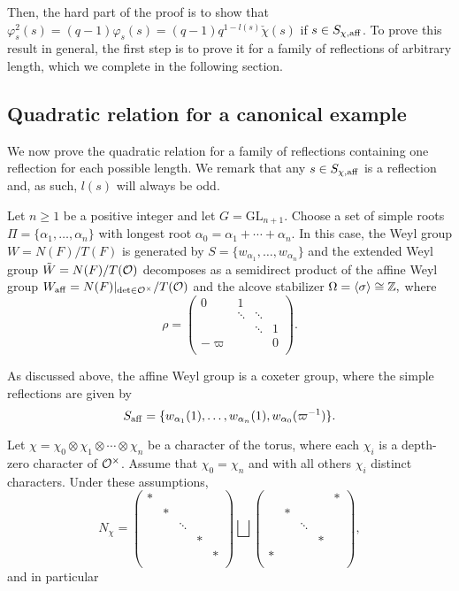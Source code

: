     Then, the hard part of the proof is to show that $\varphi_s^2(s)=(q-1)\varphi_s(s)=(q-1)q^{1-l(s)}\check{\chi}(s)$ if $s\in S_{\chi,\mathrm{aff}}$.
    To prove this result in general, the first step is to prove it for a family of reflections of arbitrary length, which we complete in the following section.

    \subsection{Quadratic relation for a canonical example}
    We now prove the quadratic relation for a family of reflections containing one reflection for each possible length. We remark that any $s\in S_{\chi,\mathrm{aff}}$ is a reflection and, as such, $l(s)$ will always be odd.

    Let $n\geq1$ be a positive integer and let $G=\mathrm{GL}_{n+1}$. Choose a set of simple roots $\Pi=\{\alpha_1,\ldots,\alpha_n\}$ with longest root $\alpha_0=\alpha_1+\cdots+\alpha_n$. In this case, the Weyl group $W=N(F)/T(F)$ is generated by $S=\{w_{\alpha_1},\ldots,w_{\alpha_n}\}$ and the extended Weyl group $\tilde{W}=N(F)/T(\mathcal{O})$ decomposes as a semidirect product of the affine Weyl group $W_{\mathrm{aff}}=N(F)|_{\det\in\mathcal{O}^\times}/T(\mathcal{O})$ and the alcove stabilizer $\Omega=\langle\sigma\rangle\cong\mathbb{Z},$ where
    $$\rho=\begin{pmatrix}
        0&1&&\\
        &\ddots&\ddots&\\
        &&\ddots&1\\
        -\varpi &&&0\\
    \end{pmatrix}.$$

    As discussed above, the affine Weyl group is a coxeter group, where the simple reflections are given by 
    $$S_{\mathrm{aff}}=\{w_{\alpha_1}(1),\ldots,w_{\alpha_n}(1),w_{\alpha_0}(\varpi^{-1})\}.$$

    Let $\chi=\chi_0\otimes\chi_1\otimes\cdots\otimes\chi_n$ be a character of the torus, where each $\chi_i$ is a depth-zero character of $\mathcal{O}^\times$. Assume that $\chi_0=\chi_n$ and with all others $\chi_i$ distinct characters. Under these assumptions, 
    $$N_\chi=\begin{pmatrix}
        *&&&&\\
        &*&&&\\
        &&\ddots&&\\
        &&&*&\\
        &&&&*\\
    \end{pmatrix}\bigsqcup\begin{pmatrix}
        &&&&*\\
        &*&&&\\
        &&\ddots&&\\
        &&&*&\\
        *&&&&\\
    \end{pmatrix},$$
    and in particular

